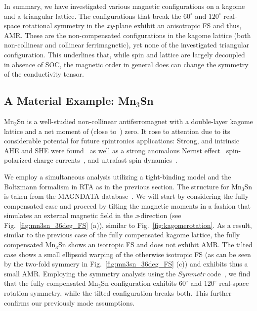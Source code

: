 \documentclass[prb,showpacs,amsmath,amssymb,superscriptaddress,twocolumn,floatfix]{revtex4-1}
\begin{document}
In summary, we have investigated various magnetic configurations on a kagome and a triangular lattice. The configurations that break the $60^\circ$ and $120^\circ$ real-space rotational symmetry in the \textit{xy}-plane exhibit an anisotropic FS and thus, AMR. These are the non-compensated configurations in the kagome lattice (both non-collinear and collinear ferrimagnetic), yet none of the investigated triangular configuration. This underlines that, while spin and lattice are largely decoupled~\cite{Gonzalez-Hernandez:2024} in absence of SOC, the magnetic order in general does can change the symmetry of the conductivity tensor.


\subsection{A Material Example: Mn$_3$Sn}
\label{sec_I_mat}

Mn$_3$Sn is a well-studied non-collinear antiferromagnet with a double-layer kagome lattice and a net moment of (close to~\cite{Tomiyashi:1982}) zero. It rose to attention due to its considerable potental for future spintronics applications: Strong, and intrinsic AHE and SHE were found~\cite{Chen:2021, Manna:2018, Nakatsuji:2015, Zhou:2020, Zhang:2017} as well as a strong anomalous Nernst effect~\cite{Chen:2021, Manna:2018, Zhou:2020} spin-polarized charge currents~\cite{Zelezny:2017}, and ultrafast spin dynamics~\cite{Chen:2021, Nakatsuji:2015}.

We employ a simultaneous analysis utilizing a tight-binding model and the Boltzmann formalism in RTA as in the previous section. The structure for Mn$_3$Sn is taken from the MAGNDATA database~\cite{Magndata:Mn3Sn}. We will start by considering the fully compensated case and proceed by tilting the magnetic moments in a fashion that simulates an external magnetic field in the \textit{x}-direction (see Fig.~\ref{fig:mn3sn_36deg_FS} (a)), similar to Fig.~\ref{fig:kagomerotation}. As a result, similar to the previous case of the fully compensated kagome lattice, the fully compensated Mn$_3$Sn shows an isotropic FS and does not exhibit AMR. The tilted case shows a small ellipsoid warping of the otherwise isotropic FS (as can be seen by the two-fold symmery in Fig.~\ref{fig:mn3sn_36deg_FS} (c)) and exhibits thus a small AMR. Employing the symmetry analysis using the \textit{Symmetr} code~\cite{Symmetr}, we find that the fully compensated Mn$_3$Sn configuration exhibits $60^\circ$ and $120^\circ$ real-space rotation symmetry, while the tilted configuration breaks both. This further confirms our previously made assumptions. \\
\end{document}
